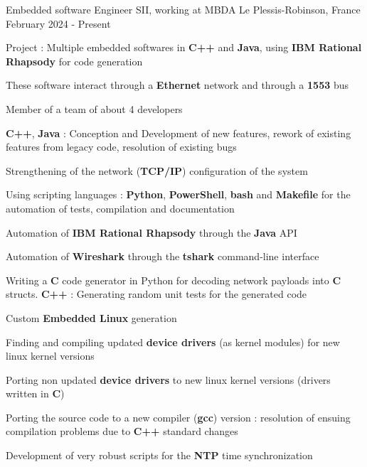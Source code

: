 

\begin{cventries}

	\cventry
	{Embedded software Engineer} %
	{SII, working at MBDA} %
	{Le Plessis-Robinson, France} %
	{February 2024 - Present} %
	{
		\begin{cvitems} %
		\item{Project : Multiple embedded softwares in \textbf{C++} and \textbf{Java}, using \textbf{IBM Rational Rhapsody} for code generation}
		\item{These software interact through a \textbf{Ethernet} network and through a \textbf{1553} bus}
		\item{Member of a team of about 4 developers}
		\item{\textbf{C++}, \textbf{Java} : Conception and Development of new features, rework of existing features from legacy code, resolution of existing bugs}
		\item{Strengthening of the network (\textbf{TCP/IP}) configuration of the system}
		\item{Using scripting languages : \textbf{Python}, \textbf{PowerShell}, \textbf{bash} and \textbf{Makefile} for the automation of tests, compilation and documentation}
		\item{Automation of \textbf{IBM Rational Rhapsody} through  the \textbf{Java} API}
		\item{Automation of \textbf{Wireshark} through  the \textbf{tshark} command-line interface}
		\item{Writing a \textbf{C} code generator in Python for decoding network payloads into \textbf{C} structs. \textbf{C++} : Generating random unit tests for the generated code}	
		\item{Custom \textbf{Embedded Linux} generation}
		\item{Finding and compiling updated \textbf{device drivers} (as kernel modules) for new linux kernel versions}
		\item{Porting non updated \textbf{device drivers} to new linux kernel versions (drivers written in \textbf{C})}
		\item{Porting the source code to a new compiler (\textbf{gcc}) version : resolution of ensuing compilation problems due to \textbf{C++} standard changes}
		\item{Development of very robust scripts for the \textbf{NTP} time synchronization}
		\end{cvitems}
	}


\end{cventries}
